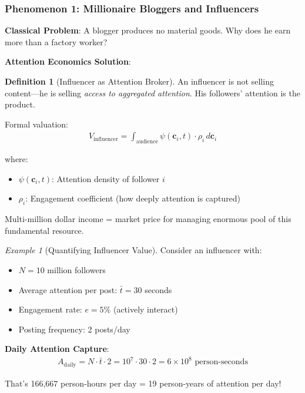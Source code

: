 \documentclass[11pt,a4paper]{article}
\theoremstyle{definition}
\newtheorem{definition}{Definition}[section]
\theoremstyle{remark}
\newtheorem{example}{Example}[section]
\newcommand{\cc}{\mathbf{c}}
\begin{document}
\begin{small}
\subsubsection{Phenomenon 1: Millionaire Bloggers and Influencers}

\textbf{Classical Problem}: A blogger produces no material goods. Why does he earn more than a factory worker?

\textbf{Attention Economics Solution}:

\begin{definition}[Influencer as Attention Broker]
An influencer is not selling content—he is selling \textit{access to aggregated attention}. His followers' attention is the product.

Formal valuation:
\begin{align}
V_{\text{influencer}} = \int_{\text{audience}} \psi(\cc_i, t) \cdot \rho_i \, d\cc_i
\end{align}

where:
\begin{itemize}
\item \(\psi(\cc_i, t)\): Attention density of follower \(i\)
\item \(\rho_i\): Engagement coefficient (how deeply attention is captured)
\end{itemize}

Multi-million dollar income = market price for managing enormous pool of this fundamental resource.
\end{definition}

\begin{example}[Quantifying Influencer Value]
Consider an influencer with:
\begin{itemize}
    \item \(N = 10\) million followers
    \item Average attention per post: \(\bar{t} = 30\) seconds
    \item Engagement rate: \(e = 5\%\) (actively interact)
    \item Posting frequency: 2 posts/day
\end{itemize}

\textbf{Daily Attention Capture}:
\begin{align}
A_{\text{daily}} = N \cdot \bar{t} \cdot 2 = 10^7 \cdot 30 \cdot 2 = 6 \times 10^8 \text{ person-seconds}
\end{align}

That's 166,667 person-hours per day = 19 person-years of attention per day!


\end{example}
\end{small}
\end{document}
